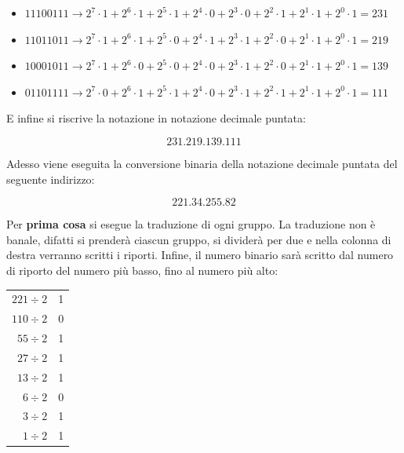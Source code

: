 \documentclass[a4paper]{article}
\begin{document}
	\begin{itemize}
		\item $11100111 \longrightarrow 2^{7} \cdot 1 + 2^{6} \cdot 1 + 2^{5} \cdot 1 + 2^{4} \cdot 0 + 2^{3} \cdot 0 + 2^{2} \cdot 1 + 2^{1} \cdot 1 + 2^{0} \cdot 1 = 231$
		
		\item $11011011 \longrightarrow 2^{7} \cdot 1 + 2^{6} \cdot 1 + 2^{5} \cdot 0 + 2^{4} \cdot 1 + 2^{3} \cdot 1 + 2^{2} \cdot 0 + 2^{1} \cdot 1 + 2^{0} \cdot 1 = 219$
		
		\item $10001011 \longrightarrow 2^{7} \cdot 1 + 2^{6} \cdot 0 + 2^{5} \cdot 0 + 2^{4} \cdot 0 + 2^{3} \cdot 1 + 2^{2} \cdot 0 + 2^{1} \cdot 1 + 2^{0} \cdot 1 = 139$
		
		\item $01101111 \longrightarrow 2^{7} \cdot 0 + 2^{6} \cdot 1 + 2^{5} \cdot 1 + 2^{4} \cdot 0 + 2^{3} \cdot 1 + 2^{2} \cdot 1 + 2^{1} \cdot 1 + 2^{0} \cdot 1 = 111$
	\end{itemize}

	\noindent
	E infine si riscrive la notazione in notazione decimale puntata:
	
	\begin{equation*}
		231.219.139.111
	\end{equation*}

	\noindent
	Adesso viene eseguita la conversione binaria della notazione decimale puntata del seguente indirizzo:
	
	\begin{equation*}
		221.34.255.82
	\end{equation*}

	\noindent
	Per \textbf{prima cosa} si esegue la traduzione di ogni gruppo. La traduzione non è banale, difatti si prenderà ciascun gruppo, si dividerà per due e nella colonna di destra verranno scritti i riporti. Infine, il numero binario sarà scritto dal numero di riporto del numero più basso, fino al numero più alto:
	
	\begin{center}
		\begin{tabular}{r|c}
			$221 \div 2$	&	1 \\
			$110 \div 2$	&	0 \\
			$55 \div 2$		&	1 \\
			$27 \div 2$		&	1 \\
			$13 \div 2$		&	1 \\
			$6 \div 2$		&	0 \\
			$3 \div 2$		&	1 \\
			$1 \div 2$		&	1			
		\end{tabular}
	\end{center}
\end{document}
